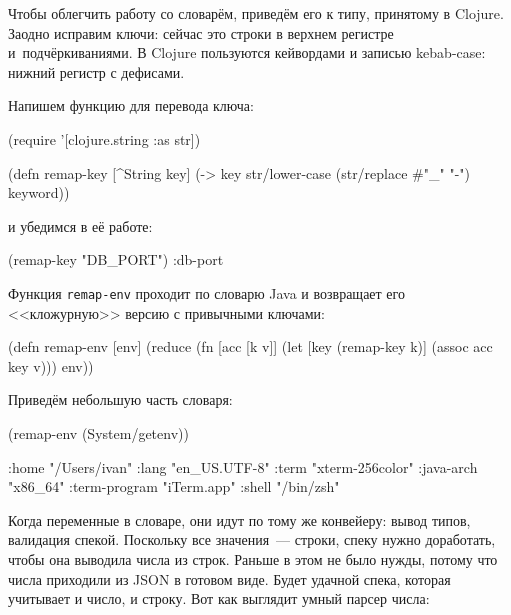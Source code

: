 Чтобы облегчить работу со словарём, приведём его к типу, принятому в
Clojure. Заодно исправим ключи: сейчас это строки в верхнем регистре
и~подчёркиваниями. В Clojure пользуются кейвордами и записью kebab-case: нижний
регистр с дефисами.

Напишем функцию для перевода ключа:

\begin{english}
  \begin{clojure}
(require '[clojure.string :as str])

(defn remap-key [^String key]
  (-> key
      str/lower-case
      (str/replace #"_" "-")
      keyword))
  \end{clojure}
\end{english}

\noindent
и убедимся в её работе:

\begin{english}
  \begin{clojure}
(remap-key "DB_PORT")
:db-port
  \end{clojure}
\end{english}


Функция \verb|remap-env| проходит по словарю Java и возвращает его
<<кложурную>> версию с привычными ключами:

\begin{english}
  \begin{clojure}
(defn remap-env [env]
  (reduce
   (fn [acc [k v]]
     (let [key (remap-key k)]
       (assoc acc key v)))
   {}
   env))
  \end{clojure}
\end{english}

Приведём небольшую часть словаря:

\begin{english}
  \begin{clojure}
(remap-env (System/getenv))

{:home "/Users/ivan"
 :lang "en_US.UTF-8"
 :term "xterm-256color"
 :java-arch "x86_64"
 :term-program "iTerm.app"
 :shell "/bin/zsh"}
  \end{clojure}
\end{english}

Когда переменные в словаре, они идут по тому же конвейеру: вывод типов,
валидация спекой. Поскольку все значения~--- строки, спеку нужно доработать, чтобы
она выводила числа из строк. Раньше в этом не было нужды, потому что числа
приходили из JSON в готовом виде. Будет удачной спека, которая учитывает и
число, и строку. Вот как выглядит умный парсер числа:

